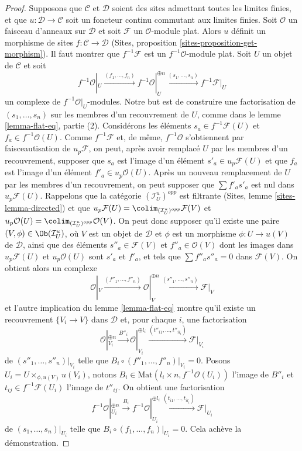 \begin{proof}
\medskip\noindent
Supposons que $\mathcal{C}$ et $\mathcal{D}$ soient des sites admettant toutes
les limites finies, et que $u : \mathcal{D} \to \mathcal{C}$ soit un foncteur
continu commutant aux limites finies. Soit $\mathcal{O}$ un faisceau d'anneaux
sur $\mathcal{D}$ et soit $\mathcal{F}$ un $\mathcal{O}$-module plat. Alors $u$
définit un morphisme de sites $f : \mathcal{C} \to \mathcal{D}$
(Sites, proposition \ref{sites-proposition-get-morphism}). Il faut montrer que
$f^{-1}\mathcal{F}$ est un $f^{-1}\mathcal{O}$-module plat. Soit $U$ un objet
de $\mathcal{C}$ et soit
$$
f^{-1}\mathcal{O}|_U \xrightarrow{(f_1, \ldots, f_n)}
f^{-1}\mathcal{O}|_U^{\oplus n} \xrightarrow{(s_1, \ldots, s_n)}
f^{-1}\mathcal{F}|_U
$$
un complexe de $f^{-1}\mathcal{O}|_U$-modules. Notre but est de construire une
factorisation de $(s_1, \ldots, s_n)$ sur les membres d'un recouvrement de $U$,
comme dans le lemme \ref{lemma-flat-eq}, partie (2).
Considérons les éléments $s_a \in f^{-1}\mathcal{F}(U)$ et
$f_a \in f^{-1}\mathcal{O}(U)$. Comme $f^{-1}\mathcal{F}$ et, de même,
$f^{-1}\mathcal{O}$ s'obtiennent par faisceautisation de $u_p\mathcal{F}$, on
peut, après avoir remplacé $U$ par les membres d'un recouvrement, supposer que
$s_a$ est l'image d'un élément
$s'_a \in u_p\mathcal{F}(U)$ et que $f_a$ est l'image d'un élément
$f'_a \in u_p\mathcal{O}(U)$. Après un nouveau remplacement de $U$ par les
membres d'un recouvrement, on peut supposer que $\sum f'_as'_a$ est nul dans
$u_p\mathcal{F}(U)$. Rappelons que la catégorie
$(\mathcal{I}_U^u)^{opp}$ est filtrante
(Sites, lemme \ref{sites-lemma-directed}) et que
$u_p\mathcal{F}(U) = \colim_{(\mathcal{I}_U^u)^{opp}} \mathcal{F}(V)$ et
$u_p\mathcal{O}(U) = \colim_{(\mathcal{I}_U^u)^{opp}} \mathcal{O}(V)$.
On peut donc supposer qu'il existe une paire
$(V, \phi) \in \Ob(\mathcal{I}_U^u)$, où $V$ est un objet de $\mathcal{D}$ et
$\phi$ est un morphisme $\phi : U \to u(V)$ de $\mathcal{D}$, ainsi que des éléments
$s''_a \in \mathcal{F}(V)$ et $f''_a \in \mathcal{O}(V)$ dont les images dans
$u_p\mathcal{F}(U)$ et $u_p\mathcal{O}(U)$ sont $s'_a$ et $f'_a$, et tels que
$\sum f''_a s''_a = 0$ dans $\mathcal{F}(V)$. On obtient alors un complexe
$$
\mathcal{O}|_V \xrightarrow{(f''_1, \ldots, f''_n)}
\mathcal{O}|_V^{\oplus n} \xrightarrow{(s''_1, \ldots, s''_n)}
\mathcal{F}|_V
$$
et l'autre implication du lemme \ref{lemma-flat-eq} montre qu'il existe un
recouvrement $\{V_i \to V\}$ dans $\mathcal{D}$ et, pour chaque $i$, une factorisation
$$
\mathcal{O}|_{V_i}^{\oplus n}
\xrightarrow{B''_i}
\mathcal{O}|_{V_i}^{\oplus l_i} \xrightarrow{(t''_{i1}, \ldots, t''_{il_i})}
\mathcal{F}|_{V_i}
$$
de $(s''_1, \ldots, s''_n)|_{V_i}$ telle que
$B_i \circ (f''_1, \ldots, f''_n)|_{V_i} = 0$.
Posons $U_i = U \times_{\phi, u(V)} u(V_i)$, notons
$B_i \in \text{Mat}(l_i \times n, f^{-1}\mathcal{O}(U_i))$ l'image de $B''_i$
et $t_{ij} \in f^{-1}\mathcal{F}(U_i)$ l'image de $t''_{ij}$. On obtient une factorisation
$$
f^{-1}\mathcal{O}|_{U_i}^{\oplus n}
\xrightarrow{B_i}
f^{-1}\mathcal{O}|_{U_i}^{\oplus l_i}
\xrightarrow{(t_{i1}, \ldots, t_{il_i})}
\mathcal{F}|_{U_i}
$$
de $(s_1, \ldots, s_n)|_{U_i}$ telle que
$B_i \circ (f_1, \ldots, f_n)|_{U_i} = 0$.
Cela achève la démonstration.
\end{proof}

